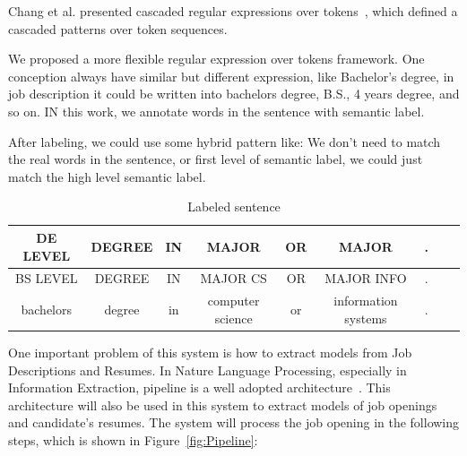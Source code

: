 Chang et al. presented cascaded regular expressions over tokens~\cite{chang2014tokensregex}, which defined a cascaded patterns over token sequences.

We proposed a more flexible regular expression over tokens framework.
One conception always have similar but different expression, like Bachelor's degree, in job description it could be written into bachelors degree, B.S., 4 years degree, and so on. IN this work, we annotate words in the sentence with semantic label.

After labeling, we could use some hybrid pattern like:
We don't need to match the real words in the sentence, or first level of semantic label, we could just match the high level semantic label.


\begin{table}[ht]
\caption{Labeled sentence } %
\centering %
\begin{tabular}{   | c | c | c | c |c | c |c | c |c|  }
 \hline
     DE LEVEL   & DEGREE & IN & MAJOR            & OR & MAJOR  &.  \\
 \hline
     BS LEVEL   & DEGREE & IN & MAJOR CS         & OR & MAJOR INFO & .      \\
 \hline
    bachelors   & degree & in & computer science & or & information systems & .     \\
  \hline     
\end{tabular}
\label{tab:labeldsent} %
\end{table}


One important problem of this system is how to extract models from Job Descriptions and Resumes.
In Nature Language Processing, especially in Information Extraction, pipeline is a well adopted architecture~\cite{sarawagi2008information}. This architecture will also be used in this system to extract models of job openings and candidate's resumes. The system will process the job opening in the following steps, which is shown in Figure~\ref{fig:Pipeline}:

